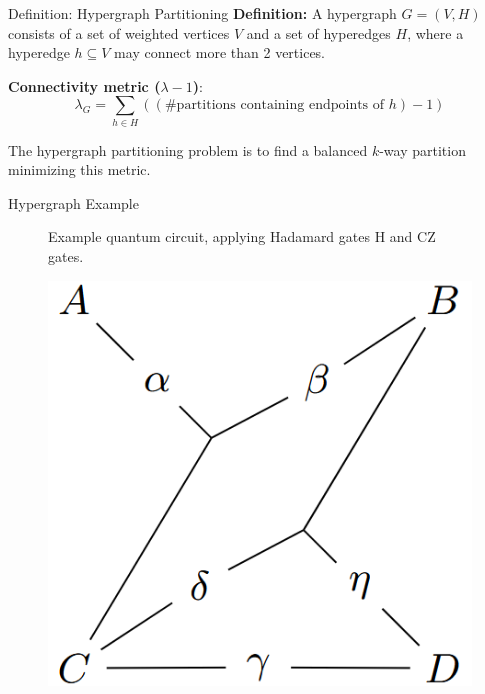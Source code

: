 \documentclass{beamer}
\begin{document}
	\begin{frame}{Definition: Hypergraph Partitioning}
		\textbf{Definition:} A hypergraph $G = (V, H)$ consists of a set of weighted vertices $V$ and a set of hyperedges $H$, where a hyperedge $h \subseteq V$ may connect more than 2 vertices.
		\vspace{1em}
		
		\textbf{Connectivity metric (\(\lambda - 1\))}:
		\[
		\lambda_G = \sum_{h \in H} ((\#\text{partitions containing endpoints of } h) - 1)
		\]
		
		The hypergraph partitioning problem is to find a balanced $k$-way partition minimizing this metric.
	\end{frame}
	
	\begin{frame}{Hypergraph Example}
		\begin{minipage}{0.48\linewidth}
			\centering
			\begin{figure}
				\caption{Example quantum circuit, applying Hadamard gates H and CZ gates.}
			\end{figure}
		\end{minipage}
		\begin{minipage}{0.48\linewidth}
			\begin{figure}
				\includegraphics[width=.8\textwidth]{figures/hyper.png}

\end{figure}
\end{minipage}
\end{frame}
\end{document}
